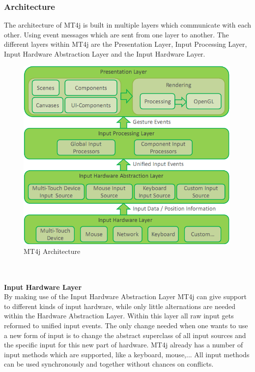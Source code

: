 \documentclass[a4paper,12pt]{report}
\begin{document}
\subsubsection{Architecture}
The architecture of MT4j is built in multiple layers which communicate with each other. Using event messages which are sent from one layer to another. The different layers within MT4j are the 
Presentation Layer, Input Processing Layer, Input Hardware Abstraction Layer and the Input Hardware Layer.
\begin{figure}
  \centering
    \includegraphics[width=0.99\textwidth]{images/ArchitectureOverview2.png}
  \caption{MT4j Architecture}
\end{figure}
\\
\\
\textbf{Input Hardware Layer}
\\
By making use of the Input Hardware Abstraction Layer MT4j can give support to different kinds of input hardware, while only little alternations are needed within the Hardware Abstraction Layer.
Within this layer all raw input gets reformed to unified input events. The only change needed when one wants to use a new form of input is to change the abstract superclass of all input sources
and the specific input for this new part of hardware.
MT4j already has a number of input methods which are supported, like a keyboard, mouse,... All input methods can be used synchronously and together without chances on conflicts.
\\
\\
\end{document}
